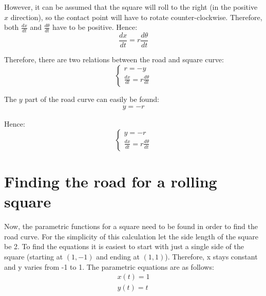 \documentclass[12pt]{article}
\begin{document}
        However, it can be assumed that the square will roll to the right (in the positive $x$ direction), so the contact point will have to rotate counter-clockwise. Therefore, both $\frac{dx}{dt}$ and $\frac{d\theta}{dt}$ have to be positive. Hence:
        \begin{equation}
            \frac{dx}{dt} = r \frac{d\theta}{dt}
        \end{equation}

        Therefore, there are two relations between the road and square curve:
        \begin{equation}
            \begin{cases}
                r = - y \\
                \frac{dx}{dt} = r \frac{d\theta}{dt}
            \end{cases}
        \end{equation}

        The $y$ part of the road curve can easily be found:
        \begin{align}
            y = -r
        \end{align}

        Hence:
        \begin{equation}\label{eq:road_1}
            \begin{cases}
                y = -r \\
                \frac{dx}{dt} = r \frac{d\theta}{dt}
            \end{cases}
        \end{equation}

    \section{Finding the road for a rolling square}

        Now, the parametric functions for a square need to be found in order to find the road curve. For the simplicity of this calculation let the side length of the square be 2. To find the equations it is easiest to start with just a single side of the square (starting at $(1, -1)$ and ending at $(1, 1)$). Therefore, x stays constant and y varies from -1 to 1. The parametric equations are as follows:
        \begin{align}
            x(t) = 1 \\
            y(t) = t
        \end{align}
\end{document}
